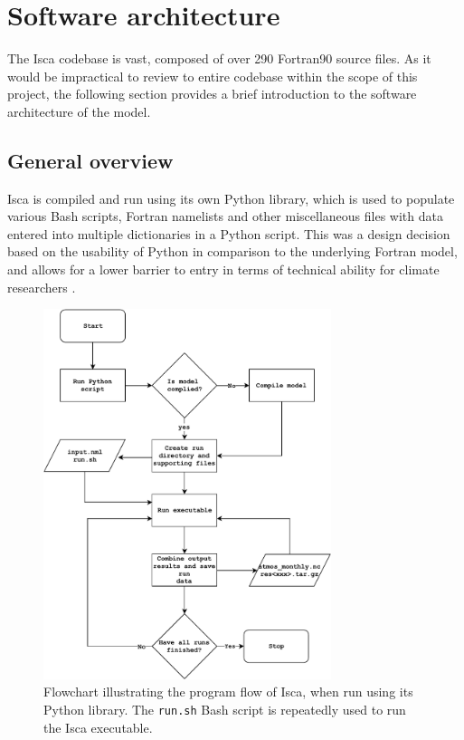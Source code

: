 \documentclass[a4paper,11pt]{report}
\begin{document}
\section{Software architecture}
The Isca codebase is vast, composed of over 290 Fortran90 source files. As it would be impractical to review to entire codebase within the scope of this project, the following section provides a brief introduction to the software architecture of the model.
\subsection{General overview}
Isca is compiled and run using its own Python library, which is used to populate various Bash scripts, Fortran namelists and other miscellaneous files with data entered into multiple dictionaries in a Python script. This was a design decision based on the usability of Python in comparison to the underlying Fortran model, and allows for a lower barrier to entry in terms of technical ability for climate researchers \cite{vallis2018isca}. 
\par
\begin{figure}[H]
\begin{center}
\includegraphics[width=0.75\textwidth]{img/isca_flow.pdf}
\caption{Flowchart illustrating the program flow of Isca, when run using its Python library. The \texttt{run.sh} Bash script is repeatedly used to run the Isca executable.}
\label{fig:flowchart}
\end{center}
\end{figure}
\end{document}
